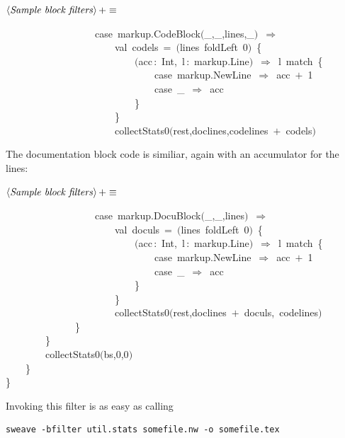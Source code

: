 \documentclass[a4paper,12pt]{article}
\begin{document}
$\left<\mbox{\emph{Sample block filters}}\right>+\equiv$
\begin{program}~~~~~~~~~~~~~~~~~~{\vem case}~markup.CodeBlock$($\_,\_,lines,\_$)$~$\Rightarrow$
\\~~~~~~~~~~~~~~~~~~~~~~{\vem val}~codels~=~$($lines~foldLeft~0$)$~{\small\{}
\\~~~~~~~~~~~~~~~~~~~~~~~~~~$($acc\,{\rm :}~Int,~l\,{\rm :}~markup.Line$)$~$\Rightarrow$~l~{\vem match}~{\small\{}
\\~~~~~~~~~~~~~~~~~~~~~~~~~~~~~~{\vem case}~markup.NewLine~$\Rightarrow$~acc~$+$~1
\\~~~~~~~~~~~~~~~~~~~~~~~~~~~~~~{\vem case}~\_~$\Rightarrow$~acc
\\~~~~~~~~~~~~~~~~~~~~~~~~~~{\small\}}
\\~~~~~~~~~~~~~~~~~~~~~~{\small\}}
\\~~~~~~~~~~~~~~~~~~~~~~collectStats0$($rest,doclines,codelines~$+$~codels$)$
\\[0.5em]\end{program}
The documentation block code is similiar, again with an accumulator for
the lines:

$\left<\mbox{\emph{Sample block filters}}\right>+\equiv$
\begin{program}~~~~~~~~~~~~~~~~~~{\vem case}~markup.DocuBlock$($\_,\_,lines$)$~$\Rightarrow$
\\~~~~~~~~~~~~~~~~~~~~~~{\vem val}~doculs~=~$($lines~foldLeft~0$)$~{\small\{}
\\~~~~~~~~~~~~~~~~~~~~~~~~~~$($acc\,{\rm :}~Int,~l\,{\rm :}~markup.Line$)$~$\Rightarrow$~l~{\vem match}~{\small\{}
\\~~~~~~~~~~~~~~~~~~~~~~~~~~~~~~{\vem case}~markup.NewLine~$\Rightarrow$~acc~$+$~1
\\~~~~~~~~~~~~~~~~~~~~~~~~~~~~~~{\vem case}~\_~$\Rightarrow$~acc
\\~~~~~~~~~~~~~~~~~~~~~~~~~~{\small\}}
\\~~~~~~~~~~~~~~~~~~~~~~{\small\}}
\\~~~~~~~~~~~~~~~~~~~~~~collectStats0$($rest,doclines~$+$~doculs,~codelines$)$
\\~~~~~~~~~~~~~~{\small\}}
\\~~~~~~~~{\small\}}
\\~~~~~~~~collectStats0$($bs,0,0$)$
\\~~~~{\small\}}
\\{\small\}}
\\[0.5em]\end{program}
Invoking this filter is as easy as calling

\begin{verbatim}
sweave -bfilter util.stats somefile.nw -o somefile.tex
\end{verbatim}
\end{document}

